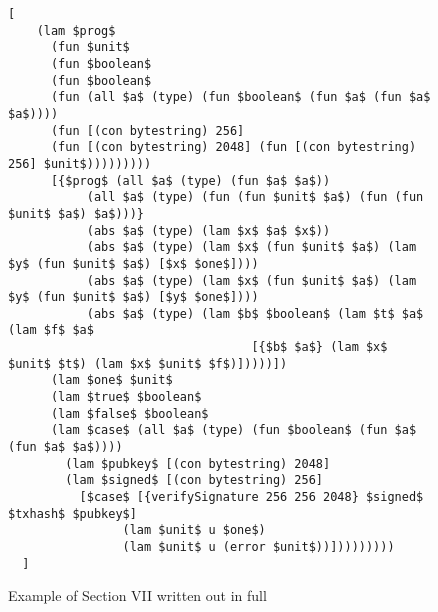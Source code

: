 \documentclass[../main.tex]{subfiles}
\begin{document}
\begin{figure*}
\begin{lstlisting}[basicstyle=\ttfamily,mathescape]
  [
    (lam $prog$
      (fun $unit$ 
      (fun $boolean$
      (fun $boolean$
      (fun (all $a$ (type) (fun $boolean$ (fun $a$ (fun $a$ $a$))))
      (fun [(con bytestring) 256]
      (fun [(con bytestring) 2048] (fun [(con bytestring) 256] $unit$)))))))))
      [{$prog$ (all $a$ (type) (fun $a$ $a$))
           (all $a$ (type) (fun (fun $unit$ $a$) (fun (fun $unit$ $a$) $a$)))}
           (abs $a$ (type) (lam $x$ $a$ $x$))
           (abs $a$ (type) (lam $x$ (fun $unit$ $a$) (lam $y$ (fun $unit$ $a$) [$x$ $one$])))
           (abs $a$ (type) (lam $x$ (fun $unit$ $a$) (lam $y$ (fun $unit$ $a$) [$y$ $one$])))
           (abs $a$ (type) (lam $b$ $boolean$ (lam $t$ $a$ (lam $f$ $a$
                                  [{$b$ $a$} (lam $x$ $unit$ $t$) (lam $x$ $unit$ $f$)]))))])
      (lam $one$ $unit$
      (lam $true$ $boolean$
      (lam $false$ $boolean$
      (lam $case$ (all $a$ (type) (fun $boolean$ (fun $a$ (fun $a$ $a$))))
        (lam $pubkey$ [(con bytestring) 2048]
        (lam $signed$ [(con bytestring) 256]
          [$case$ [{verifySignature 256 256 2048} $signed$ $txhash$ $pubkey$]
                (lam $unit$ u $one$)
                (lam $unit$ u (error $unit$))]))))))))
  ]
\end{lstlisting}
\caption{Example of Section VII written out in full}
\label{fig:Continuized_Let_Example}
\end{figure*}





\end{document}
